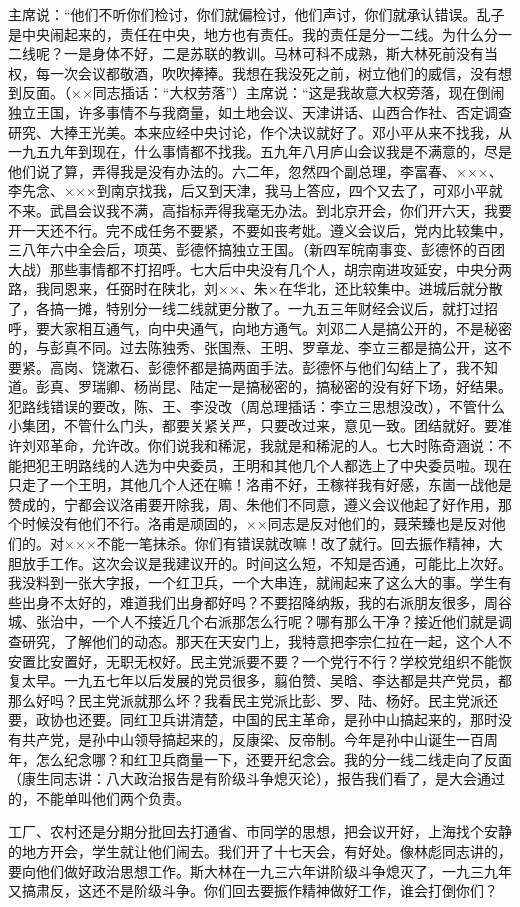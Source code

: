 主席说：“他们不听你们检讨，你们就偏检讨，他们声讨，你们就承认错误。乱子是中央闹起来的，责任在中央，地方也有责任。我的责任是分一二线。为什么分一二线呢？一是身体不好，二是苏联的教训。马林可科不成熟，斯大林死前没有当权，每一次会议都敬酒，吹吹捧捧。我想在我没死之前，树立他们的威信，没有想到反面。（××同志插话：“大权劳落”）主席说：“这是我故意大权旁落，现在倒闹独立王国，许多事情不与我商量，如土地会议、天津讲话、山西合作社、否定调查研究、大捧王光美。本来应经中央讨论，作个决议就好了。邓小平从来不找我，从一九五九年到现在，什么事情都不找我。五九年八月庐山会议我是不满意的，尽是他们说了算，弄得我是没有办法的。六二年，忽然四个副总理，李富春、×××、李先念、×××到南京找我，后又到天津，我马上答应，四个又去了，可邓小平就不来。武昌会议我不满，高指标弄得我毫无办法。到北京开会，你们开六天，我要开一天还不行。完不成任务不要紧，不要如丧考妣。遵义会议后，党内比较集中，三八年六中全会后，项英、彭德怀搞独立王国。（新四军皖南事变、彭德怀的百团大战）那些事情都不打招呼。七大后中央没有几个人，胡宗南进攻延安，中央分两路，我同恩来，任弼时在陕北，刘××、朱×在华北，还比较集中。进城后就分散了，各搞一摊，特别分一线二线就更分散了。一九五三年财经会议后，就打过招呼，要大家相互通气，向中央通气，向地方通气。刘邓二人是搞公开的，不是秘密的，与彭真不同。过去陈独秀、张国焘、王明、罗章龙、李立三都是搞公开，这不要紧。高岗、饶漱石、彭德怀都是搞两面手法。彭德怀与他们勾结上了，我不知道。彭真、罗瑞卿、杨尚昆、陆定一是搞秘密的，搞秘密的没有好下场，好结果。犯路线错误的要改，陈、王、李没改（周总理插话：李立三思想没改），不管什么小集团，不管什么门头，都要关紧关严，只要改过来，意见一致。团结就好。要准许刘邓革命，允许改。你们说我和稀泥，我就是和稀泥的人。七大时陈奇涵说：不能把犯王明路线的人选为中央委员，王明和其他几个人都选上了中央委员啦。现在只走了一个王明，其他几个人还在嘛！洛甫不好，王稼祥我有好感，东崮一战他是赞成的，宁都会议洛甫要开除我，周、朱他们不同意，遵义会议他起了好作用，那个时候没有他们不行。洛甫是顽固的，××同志是反对他们的，聂荣臻也是反对他们的。对×××不能一笔抹杀。你们有错误就改嘛！改了就行。回去振作精神，大胆放手工作。这次会议是我建议开的。时间这么短，不知是否通，可能比上次好。我没料到一张大字报，一个红卫兵，一个大串连，就闹起来了这么大的事。学生有些出身不太好的，难道我们出身都好吗？不要招降纳叛，我的右派朋友很多，周谷城、张治中，一个人不接近几个右派那怎么行呢？哪有那么干净？接近他们就是调查研究，了解他们的动态。那天在天安门上，我特意把李宗仁拉在一起，这个人不安置比安置好，无职无权好。民主党派要不要？一个党行不行？学校党组织不能恢复太早。一九五七年以后发展的党员很多，翦伯赞、吴晗、李达都是共产党员，都那么好吗？民主党派就那么坏？我看民主党派比彭、罗、陆、杨好。民主党派还要，政协也还要。同红卫兵讲清楚，中国的民主革命，是孙中山搞起来的，那时没有共产党，是孙中山领导搞起来的，反康梁、反帝制。今年是孙中山诞生一百周年，怎么纪念哪？和红卫兵商量一下，还要开纪念会。我的分一线二线走向了反面（康生同志讲：八大政治报告是有阶级斗争熄灭论），报告我们看了，是大会通过的，不能单叫他们两个负责。

工厂、农村还是分期分批回去打通省、市同学的思想，把会议开好，上海找个安静的地方开会，学生就让他们闹去。我们开了十七天会，有好处。像林彪同志讲的，要向他们做好政治思想工作。斯大林在一九三六年讲阶级斗争熄灭了，一九三九年又搞肃反，这还不是阶级斗争。你们回去要振作精神做好工作，谁会打倒你们？

